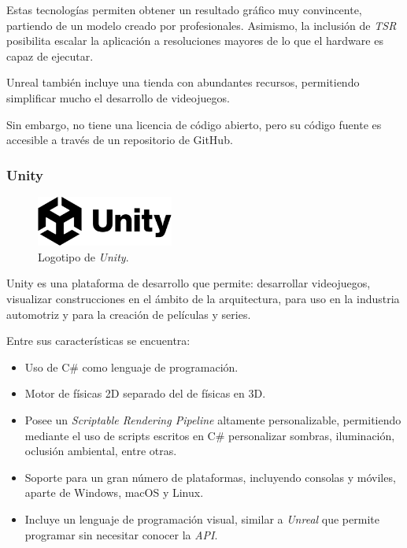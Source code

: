 Estas tecnologías permiten obtener un resultado gráfico muy convincente, partiendo de un modelo creado por profesionales. Asimismo, la inclusión de \textit{TSR} posibilita escalar la aplicación a resoluciones mayores de lo que el hardware es capaz de ejecutar.

\bigskip

Unreal también incluye una tienda con abundantes recursos, permitiendo simplificar mucho el desarrollo de videojuegos.

\bigskip

Sin embargo, no tiene una licencia de código abierto, pero su código fuente es accesible a través de un repositorio de GitHub.

\subsubsection{Unity}

\begin{figure}[H]
   \centering
   \includegraphics[width=0.4\textwidth]{imagenes/UNITY_LOGO.png}
   \caption{Logotipo de \textit{Unity}\cite{unity}.}
\end{figure}

Unity \cite{unity} es una plataforma de desarrollo que permite: desarrollar videojuegos, visualizar construcciones en el ámbito de la arquitectura, para uso en la industria automotriz y para la creación de películas y series.

\bigskip

Entre sus características se encuentra:

\begin{itemize}
   \item Uso de C\# como lenguaje de programación.
   \item Motor de físicas 2D separado del de físicas en 3D.
   \item Posee un \textit{Scriptable Rendering Pipeline} altamente personalizable, permitiendo mediante el uso de scripts escritos en C\# personalizar sombras, iluminación, oclusión ambiental, entre otras.
   \item Soporte para un gran número de plataformas, incluyendo consolas y móviles, aparte de Windows, macOS y Linux.
   \item Incluye un lenguaje de programación visual, similar a \textit{Unreal} que permite programar sin necesitar conocer la \textit{API}.
\end{itemize}
   
